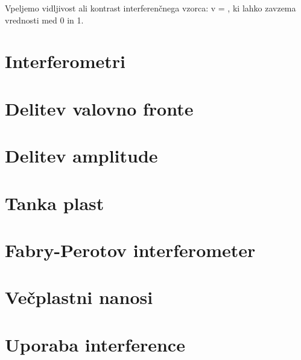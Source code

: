 Vpeljemo vidljivost ali kontrast interferenčnega vzorca:
\beq
v = ,
\label{eq:06_08}
\eeq
ki lahko zavzema vrednosti med 0 in 1.








\section{Interferometri}
\section{Delitev valovno fronte}
\section{Delitev amplitude}
\section{Tanka plast}
\section{Fabry-Perotov interferometer}
\section{Večplastni nanosi}
\section{Uporaba interference}
